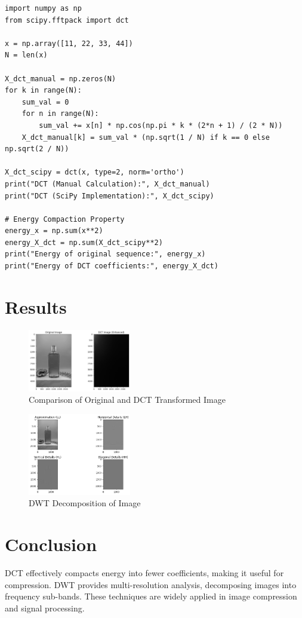 \documentclass{report}
\begin{document}

\begin{lstlisting}
import numpy as np
from scipy.fftpack import dct

x = np.array([11, 22, 33, 44])
N = len(x)

X_dct_manual = np.zeros(N)
for k in range(N):
    sum_val = 0
    for n in range(N):
        sum_val += x[n] * np.cos(np.pi * k * (2*n + 1) / (2 * N))
    X_dct_manual[k] = sum_val * (np.sqrt(1 / N) if k == 0 else np.sqrt(2 / N))

X_dct_scipy = dct(x, type=2, norm='ortho')
print("DCT (Manual Calculation):", X_dct_manual)
print("DCT (SciPy Implementation):", X_dct_scipy)

# Energy Compaction Property
energy_x = np.sum(x**2)
energy_X_dct = np.sum(X_dct_scipy**2)
print("Energy of original sequence:", energy_x)
print("Energy of DCT coefficients:", energy_X_dct)
\end{lstlisting}

\section{Results}

\begin{figure}[h]
    \centering
        \includegraphics[width=0.4\textwidth]{images/Exp-8-Results-3.png}
    \caption{Comparison of Original and DCT Transformed Image}
\end{figure}

\begin{figure}[h]
    \centering
        \includegraphics[width=0.4\textwidth]{images/Exp-8-Results-2.png}
    \caption{DWT Decomposition of Image}
\end{figure}

\section{Conclusion}
DCT effectively compacts energy into fewer coefficients, making it useful for compression. DWT provides multi-resolution analysis, decomposing images into frequency sub-bands. These techniques are widely applied in image compression and signal processing.
\end{document}
